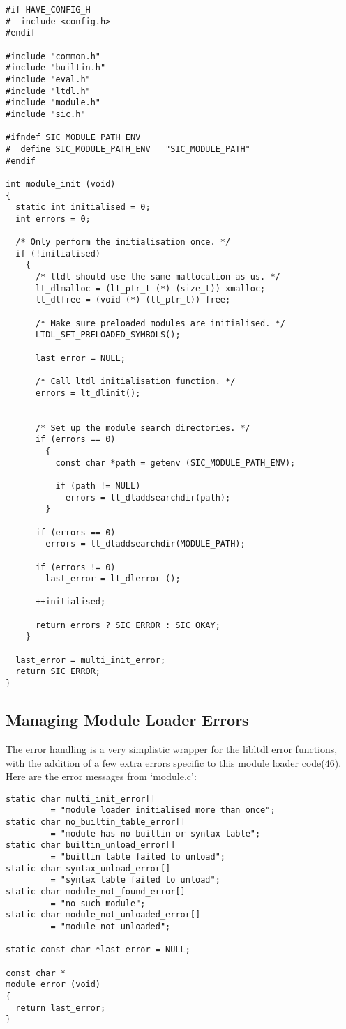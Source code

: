 \begin{Verbatim}[frame=single]
#if HAVE_CONFIG_H
#  include <config.h>
#endif

#include "common.h"
#include "builtin.h"
#include "eval.h"
#include "ltdl.h"
#include "module.h"
#include "sic.h"

#ifndef SIC_MODULE_PATH_ENV
#  define SIC_MODULE_PATH_ENV   "SIC_MODULE_PATH"
#endif

int module_init (void)
{
  static int initialised = 0;
  int errors = 0;

  /* Only perform the initialisation once. */
  if (!initialised)
    {
      /* ltdl should use the same mallocation as us. */
      lt_dlmalloc = (lt_ptr_t (*) (size_t)) xmalloc;
      lt_dlfree = (void (*) (lt_ptr_t)) free;

      /* Make sure preloaded modules are initialised. */
      LTDL_SET_PRELOADED_SYMBOLS();

      last_error = NULL;

      /* Call ltdl initialisation function. */
      errors = lt_dlinit();


      /* Set up the module search directories. */
      if (errors == 0)
        {
          const char *path = getenv (SIC_MODULE_PATH_ENV);

          if (path != NULL)
            errors = lt_dladdsearchdir(path);
        }

      if (errors == 0)
        errors = lt_dladdsearchdir(MODULE_PATH);

      if (errors != 0)
        last_error = lt_dlerror ();

      ++initialised;

      return errors ? SIC_ERROR : SIC_OKAY;
    }

  last_error = multi_init_error;
  return SIC_ERROR;
}
\end{Verbatim}

\subsection{Managing Module Loader Errors}

The error handling is a very simplistic wrapper for the libltdl error 
functions, with the addition of a few extra errors specific to this module 
loader code(46). Here are the error messages from `module.c':

 	
\begin{Verbatim}[frame=single]
static char multi_init_error[]
         = "module loader initialised more than once";
static char no_builtin_table_error[]
         = "module has no builtin or syntax table";
static char builtin_unload_error[]
         = "builtin table failed to unload";
static char syntax_unload_error[]
         = "syntax table failed to unload";
static char module_not_found_error[]
         = "no such module";
static char module_not_unloaded_error[]
         = "module not unloaded";

static const char *last_error = NULL;

const char *
module_error (void)
{
  return last_error;
}
\end{Verbatim}

